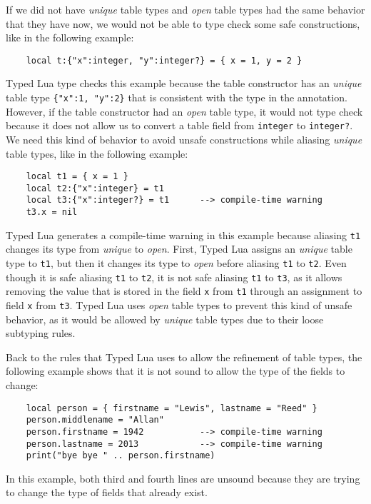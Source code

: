 If we did not have \emph{unique} table types and \emph{open}
table types had the same behavior that they have now,
we would not be able to type check some safe constructions,
like in the following example:
\begin{verbatim}
    local t:{"x":integer, "y":integer?} = { x = 1, y = 2 }
\end{verbatim}

Typed Lua type checks this example because the table constructor
has an \emph{unique} table type \texttt{\{"x":1, "y":2\}}
that is consistent with the type in the annotation.
However, if the table constructor had an \emph{open} table type,
it would not type check because it does not allow us to convert
a table field from \texttt{integer} to \texttt{integer?}.
We need this kind of behavior to avoid unsafe constructions
while aliasing \emph{unique} table types, like in the following
example:
\begin{verbatim}
    local t1 = { x = 1 }
    local t2:{"x":integer} = t1
    local t3:{"x":integer?} = t1      --> compile-time warning
    t3.x = nil
\end{verbatim}

Typed Lua generates a compile-time warning in this example
because aliasing \texttt{t1} changes its type from \emph{unique} to \emph{open}.
First, Typed Lua assigns an \emph{unique} table type to \texttt{t1},
but then it changes its type to \emph{open} before aliasing
\texttt{t1} to \texttt{t2}.
Even though it is safe aliasing \texttt{t1} to \texttt{t2},
it is not safe aliasing \texttt{t1} to \texttt{t3}, as it allows
removing the value that is stored in the field \texttt{x} from
\texttt{t1} through an assignment to field \texttt{x} from \texttt{t3}.
Typed Lua uses \emph{open} table types to prevent this kind of
unsafe behavior, as it would be allowed by \emph{unique} table
types due to their loose subtyping rules.

Back to the rules that Typed Lua uses to allow the refinement
of table types, the following example shows that it is not sound
to allow the type of the fields to change:
\begin{verbatim}
    local person = { firstname = "Lewis", lastname = "Reed" }
    person.middlename = "Allan"
    person.firstname = 1942           --> compile-time warning
    person.lastname = 2013            --> compile-time warning
    print("bye bye " .. person.firstname)
\end{verbatim}

In this example, both third and fourth lines are unsound because
they are trying to change the type of fields that already exist.


